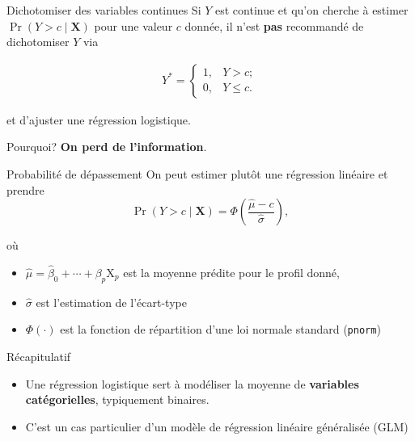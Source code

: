 \documentclass[
  ignorenonframetext,
]{beamer}
\providecommand{\tightlist}{%
  \setlength{\itemsep}{0pt}\setlength{\parskip}{0pt}}\usepackage{longtable,booktabs,array}
\begin{document}
\begin{frame}{Dichotomiser des variables continues}
\protect\hypertarget{dichotomiser-des-variables-continues}{}
Si \(Y\) est continue et qu'on cherche à estimer
\(\Pr(Y> c \mid \mathbf{X})\) pour une valeur \(c\) donnée, il n'est
\textbf{pas} recommandé de dichotomiser \(Y\) via

\begin{align*}
Y^{*} = \begin{cases}
1, & Y > c; \\
0, & Y \leq c.
\end{cases}
\end{align*}

et d'ajuster une régression logistique.

Pourquoi? \textbf{On perd de l'information}.
\end{frame}

\begin{frame}[fragile]{Probabilité de dépassement}
\protect\hypertarget{probabilituxe9-de-duxe9passement}{}
On peut estimer plutôt une régression linéaire et prendre
\[\Pr(Y > c \mid \mathbf{X}) = \Phi\left(\frac{\widehat{\mu}-c}{\widehat{\sigma}}\right),\]

où

\begin{itemize}
\tightlist
\item
  \(\widehat{\mu}=\widehat{\beta}_0 + \cdots + \beta_p\mathrm{X}_p\) est
  la moyenne prédite pour le profil donné,
\item
  \(\widehat{\sigma}\) est l'estimation de l'écart-type
\item
  \(\Phi(\cdot)\) est la fonction de répartition d'une loi normale
  standard (\texttt{pnorm})
\end{itemize}
\end{frame}

\begin{frame}{Récapitulatif}
\protect\hypertarget{ruxe9capitulatif}{}
\begin{itemize}
\tightlist
\item
  Une régression logistique sert à modéliser la moyenne de
  \textbf{variables catégorielles}, typiquement binaires.
\item
  C'est un cas particulier d'un modèle de régression linéaire
  généralisée (GLM)
\end{itemize}
\end{frame}
\end{document}
